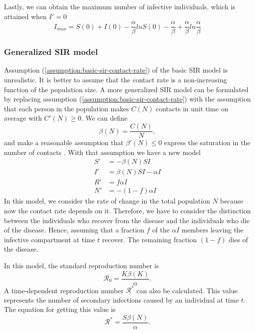 Lastly, we can obtain the maximum number of infective individuals, which is attained when $I' = 0$ \cite{brauerCompartmentalModelsEpidemiology2008}
\begin{equation*}
    I_{max} = S(0) + I(0) - \frac{\alpha}{\beta} ln S(0) - \frac{\alpha}{\beta} + \frac{\alpha}{\beta} ln \frac{\alpha}{\beta}
\end{equation*}

\subsubsection{Generalized SIR model}

Assumption (\ref{assumption:basic-sir-contact-rate}) of the basic SIR model is unrealistic.
It is better to assume that the contact rate is a non-increasing function of the population size.
A more generalized SIR model can be formulated by replacing assumption (\ref{assumption:basic-sir-contact-rate}) with the assumption that each person in the population makes $C(N)$ contacts in unit time on average with $C'(N) \geq 0$.
We can define
\begin{equation*}
    \beta(N) = \frac{C(N)}{N},
\end{equation*}
and make a reasonable assumption that $\beta'(N) \leq 0$ express the saturation in the number of contacts \cite{brauerCompartmentalModelsEpidemiology2008}.
With that assumption we have a new model
\begin{align*}
    S' &= - \beta(N)SI \\
    I' &= \beta(N)SI - \alpha I \\
    R' &= f \alpha I \\
    N' &= - (1 - f) \alpha I
\end{align*}
In this model, we consider the rate of change in the total population $N$ because now the contact rate depends on it.
Therefore, we have to consider the distinction between the individuals who recover from the disease and the individuals who die of the disease.
Hence, assuming that a fraction $f$ of the $\alpha I$ members leaving the infective compartment at time $t$ recover.
The remaining fraction $(1 - f)$ dies of the disease.

In this model, the standard reproduction number is \cite{brauerCompartmentalModelsEpidemiology2008}
\begin{equation}
    \mathcal{R}_0 = \frac{K\beta(K)}{\alpha}.
    \label{eq:generalized-sir-r0}
\end{equation}
A time-dependent reproduction number $\mathcal{R}^*$ can also be calculated.
This value represents the number of secondary infections caused by an individual at time $t$.
The equation for getting this value is \cite{brauerCompartmentalModelsEpidemiology2008}
\begin{equation*}
    \mathcal{R}^* = \frac{S\beta(N)}{\alpha}.
\end{equation*}

